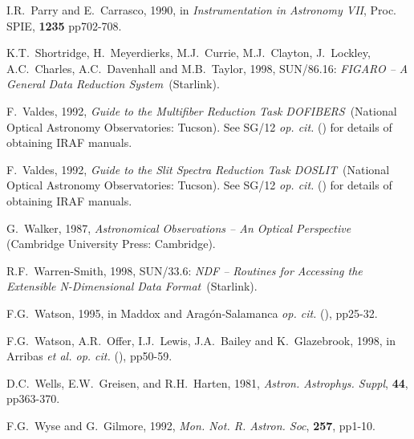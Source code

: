 \documentclass[twoside,11pt]{article}
\newcommand{\xref}[3]{#1}
\begin{document}
\begin{thebibliography}{99}
   I.R.~Parry and E.~Carrasco, 1990, in {\it
   Instrumentation in Astronomy VII}, Proc. SPIE, {\bf 1235} pp702-708.

   K.T.~Shortridge, H.~Meyerdierks, M.J.~Currie,
   M.J.~Clayton, J.~Lockley, A.C.~Charles, A.C.~Davenhall and M.B.~Taylor,
   1998, \xref{SUN/86.16}{sun86}{}: {\it FIGARO -- A General Data
   Reduction System}\, (Starlink).

   F.~Valdes, 1992, {\it Guide to the Multifiber
   Reduction Task DOFIBERS}\, (National Optical Astronomy
   Observatories: Tucson).  See \xref{SG/12}{sg12}{} {\it op. cit.}\/
   (\cite{SG12}) for details of obtaining IRAF manuals.

   F.~Valdes, 1992, {\it Guide to the Slit Spectra
   Reduction Task DOSLIT}\, (National Optical Astronomy Observatories:
   Tucson).  See \xref{SG/12}{sg12}{} {\it op. cit.}\/ (\cite{SG12}) for
   details of obtaining IRAF manuals.

   G.~Walker, 1987, {\it Astronomical Observations
   -- An Optical Perspective}\, (Cambridge University Press: Cambridge).

   R.F.~Warren-Smith, 1998, \xref{SUN/33.6}{sun33}{}:
   {\it NDF -- Routines for Accessing the Extensible N-Dimensional Data
   Format}\, (Starlink).

   F.G.~Watson, 1995, in Maddox and Arag\'{o}n-Salamanca
   {\it op. cit.}\/ (\cite{MADDOX95}), pp25-32.

   F.G.~Watson, A.R.~Offer, I.J.~Lewis, J.A.~Bailey
   and K.~Glazebrook, 1998, in Arribas {\it et al. op. cit.}\/
   (\cite{ARRIBAS98}), pp50-59.

   D.C.~Wells, E.W.~Greisen, and R.H.~Harten, 1981,
   {\it Astron. Astrophys. Suppl}, {\bf 44}, pp363-370.

   F.G.~Wyse and G.~Gilmore, 1992, {\it Mon. Not. R.
   Astron. Soc}, {\bf 257}, pp1-10.

\end{thebibliography}

\typeout{  }
\typeout{*****************************************************}
\typeout{  }
\typeout{  }
\typeout{*****************************************************}
\typeout{  }
\end{document}
